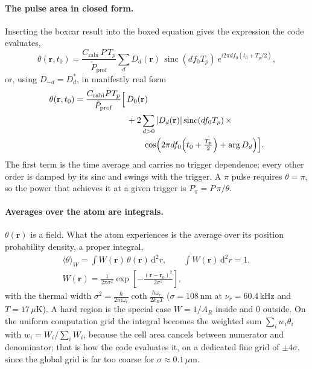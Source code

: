 \paragraph{The pulse area in closed form.}
Inserting the boxcar result into the boxed equation gives the expression the
code evaluates,
\begin{equation}
\theta(\mathbf r,t_0)
=\frac{C_\mathrm{rabi}\,P\,T_p}{\tilde P_\mathrm{prof}}
\sum_d D_d(\mathbf r)\,\operatorname{sinc}(df_0T_p)\,
e^{i2\pi df_0\left(t_0+T_p/2\right)} ,
\end{equation}
or, using $D_{-d}=D_d^*$, in manifestly real form
\begin{equation}
\begin{split}
\theta(\mathbf r,t_0)=\frac{C_\mathrm{rabi}PT_p}{\tilde P_\mathrm{prof}}
\Bigl[\,&D_0(\mathbf r)\\
&+2\sum_{d>0}\left|D_d(\mathbf r)\right|\operatorname{sinc}(df_0T_p)\,\times\\
&\qquad\cos\!\left(2\pi df_0\!\left(t_0+\tfrac{T_p}{2}\right)+\arg D_d\right)
\Bigr].
\end{split}
\end{equation}
The first term is the time average and carries no trigger dependence; every
other order is damped by its sinc and swings with the trigger. A $\pi$ pulse
requires $\theta=\pi$, so the power that achieves it at a given trigger is
$P_\pi=P\,\pi/\theta$.

\paragraph{Averages over the atom are integrals.}
$\theta(\mathbf r)$ is a field. What the atom experiences is the average over
its position probability density, a proper integral,
\begin{gather}
\langle\theta\rangle_W=\int\! W(\mathbf r)\,\theta(\mathbf r)\,\mathrm d^2r,
\qquad \int\! W(\mathbf r)\,\mathrm d^2r=1,\\
W(\mathbf r)=\frac{1}{2\pi\sigma^2}
\exp\!\left[-\frac{(\mathbf r-\mathbf r_0)^2}{2\sigma^2}\right],
\end{gather}
with the thermal width
$\sigma^2=\frac{\hbar}{2m\omega_r}\coth\frac{\hbar\omega_r}{2k_BT}$
($\sigma=108$\,nm at $\nu_r=60.4$\,kHz and $T=17\,\mu$K). A hard region is the
special case $W=1/A_R$ inside and $0$ outside. On the uniform computation grid
the integral becomes the weighted sum
$\sum_i w_i\theta_i$ with $w_i=W_i/\sum_iW_i$, because the cell area cancels
between numerator and denominator; that is how the code evaluates it, on a
dedicated fine grid of $\pm4\sigma$, since the global grid is far too coarse for
$\sigma\approx0.1\,\mu$m.

